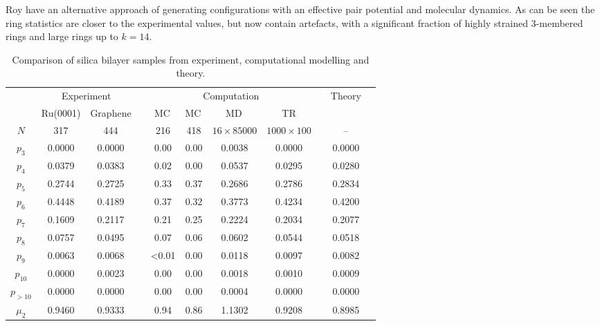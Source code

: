 {Roy \etal{} have an alternative approach of generating configurations with an effective pair potential and molecular dynamics.
As can be seen the ring statistics are closer to the experimental values, but now contain artefacts, with a significant fraction of highly strained 3\--membered rings and large rings up to $k=14$.\unskip\parfillskip 0pt \par}


\begin{landscape}
\begin{table}
\centering
\caption{Comparison of silica bilayer samples from experiment, computational modelling and theory.}
\label{tab:trpk}
\begin{threeparttable}
\begin{tabular}{@{}ccccccccccc@{}}
\toprule
& \multicolumn{2}{c}{Experiment} & \phantom{xxx} & \multicolumn{4}{c}{Computation} & \phantom{xxx} & \multicolumn{1}{c}{Theory} \\ 
\cmidrule{2-3} \cmidrule{5-8} \cmidrule{10-10}
& Ru(0001) \cite{Buchner2016a} & Graphene \cite{Huang2012} & & MC\tnote{a}\, \cite{Kumar2014} & MC\tnote{a}\, \cite{Kumar2014} & MD\tnote{b}\, \cite{Roy2018} & TR\tnote{c} & & \lm{} \cite{Gervois1992}  \\ 
\midrule
$N$ & 317    & 444    &&    216 & 418      & $16 \times 85000$ & $1000 \times 100$ && \--- \\ 
$p_3$  &0.0000 & 0.0000 && 0.00 & 0.00     & 0.0038            & 0.0000 && 0.0000 \\ 
$p_4$  &0.0379 & 0.0383 && 0.02   & 0.00     & 0.0537            & 0.0295 && 0.0280 \\  
$p_5$  &0.2744 & 0.2725 && 0.33   & 0.37     & 0.2686            & 0.2786 && 0.2834 \\
$p_6$  &0.4448 & 0.4189 && 0.37   & 0.32     & 0.3773            & 0.4234 &&  0.4200 \\  
$p_7$  &0.1609 & 0.2117 && 0.21   & 0.25     & 0.2224            & 0.2034 && 0.2077 \\  
$p_8$  &0.0757 & 0.0495 && 0.07   & 0.06     & 0.0602            & 0.0544 && 0.0518 \\ 
$p_9$  &0.0063 & 0.0068 && <0.01  & 0.00     & 0.0118            & 0.0097 && 0.0082 \\
$p_{10}$  &0.0000 & 0.0023 && 0.00 & 0.00  & 0.0018            & 0.0010 && 0.0009 \\
$p_{>10}$  &0.0000 & 0.0000 && 0.00 & 0.00 & 0.0004            & 0.0000 && 0.0000 \\ 
$\mu_2$ &  0.9460 & 0.9333 &&  0.94 & 0.86 & 1.1302 & 0.9208 && 0.8985 \\ 

\end{tabular}
\end{threeparttable}
\end{table}
\end{landscape}
